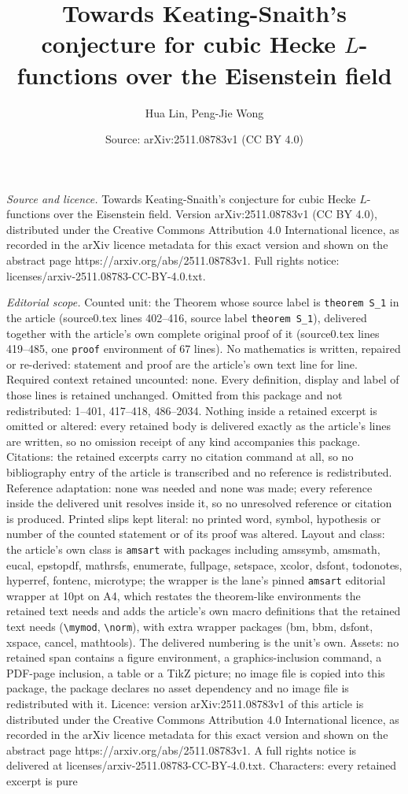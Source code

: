 \documentclass[10pt,a4paper]{amsart}
\title[Towards Keating-Snaith's conjecture for cubic Hecke $L$-func]{Towards Keating-Snaith's conjecture for cubic Hecke $L$-functions over the Eisenstein field}
\author{Hua Lin, Peng-Jie Wong}
\date{Source: arXiv:2511.08783v1 (CC BY 4.0)}
\begin{document}
\maketitle

\noindent\emph{Source and licence.} Towards Keating-Snaith's conjecture for cubic Hecke $L$-functions over the Eisenstein field. Version arXiv:2511.08783v1 (CC BY 4.0), distributed under the Creative Commons Attribution 4.0 International licence, as recorded in the arXiv licence metadata for this exact version and shown on the abstract page https://arxiv.org/abs/2511.08783v1. Full rights notice: licenses/arxiv-2511.08783-CC-BY-4.0.txt.\par\smallskip

\noindent\textit{Editorial scope.} Counted unit: the Theorem whose source label is \texttt{theorem S\_1} in the article (source0.tex lines 402--416, source label \texttt{theorem S\_1}), delivered together with the article's own complete original proof of it (source0.tex lines 419--485, one \texttt{proof} environment of 67 lines). No mathematics is written, repaired or re-derived: statement and proof are the article's own text line for line. Required context retained uncounted: none. Every definition, display and label of those lines is retained unchanged. Omitted from this package and not redistributed: 1--401, 417--418, 486--2034. Nothing inside a retained excerpt is omitted or altered: every retained body is delivered exactly as the article's lines are written, so no omission receipt of any kind accompanies this package. Citations: the retained excerpts carry no citation command at all, so no bibliography entry of the article is transcribed and no reference is redistributed. Reference adaptation: none was needed and none was made; every reference inside the delivered unit resolves inside it, so no unresolved reference or citation is produced. Printed slips kept literal: no printed word, symbol, hypothesis or number of the counted statement or of its proof was altered. Layout and class: the article's own class is \texttt{amsart} with packages including amssymb, amsmath, eucal, epstopdf, mathrsfs, enumerate, fullpage, setspace, xcolor, dsfont, todonotes, hyperref, fontenc, microtype; the wrapper is the lane's pinned \texttt{amsart} editorial wrapper at 10pt on A4, which restates the theorem-like environments the retained text needs and adds the article's own macro definitions that the retained text needs (\texttt{\textbackslash mymod}, \texttt{\textbackslash norm}), with extra wrapper packages (bm, bbm, dsfont, xspace, cancel, mathtools). The delivered numbering is the unit's own. Assets: no retained span contains a figure environment, a graphics-inclusion command, a PDF-page inclusion, a table or a TikZ picture; no image file is copied into this package, the package declares no asset dependency and no image file is redistributed with it. Licence: version arXiv:2511.08783v1 of this article is distributed under the Creative Commons Attribution 4.0 International licence, as recorded in the arXiv licence metadata for this exact version and shown on the abstract page https://arxiv.org/abs/2511.08783v1. A full rights notice is delivered at licenses/arxiv-2511.08783-CC-BY-4.0.txt. Characters: every retained excerpt is pure 
\end{document}
